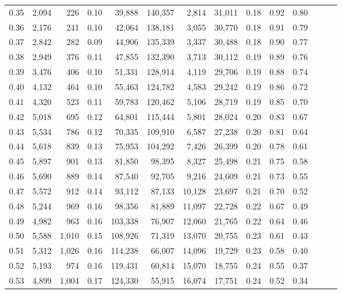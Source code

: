 \begin{tabular}{rrrrrrrrrrrrrr}
0.35 &  2,094 &    226 &  0.10 &   39,888 &  140,357 &   2,814 &  31,011 &  0.18 &  0.92 &      0.80 \\
0.36 &  2,176 &    241 &  0.10 &   42,064 &  138,181 &   3,055 &  30,770 &  0.18 &  0.91 &      0.79 \\
0.37 &  2,842 &    282 &  0.09 &   44,906 &  135,339 &   3,337 &  30,488 &  0.18 &  0.90 &      0.77 \\
0.38 &  2,949 &    376 &  0.11 &   47,855 &  132,390 &   3,713 &  30,112 &  0.19 &  0.89 &      0.76 \\
0.39 &  3,476 &    406 &  0.10 &   51,331 &  128,914 &   4,119 &  29,706 &  0.19 &  0.88 &      0.74 \\
0.40 &  4,132 &    464 &  0.10 &   55,463 &  124,782 &   4,583 &  29,242 &  0.19 &  0.86 &      0.72 \\
0.41 &  4,320 &    523 &  0.11 &   59,783 &  120,462 &   5,106 &  28,719 &  0.19 &  0.85 &      0.70 \\
0.42 &  5,018 &    695 &  0.12 &   64,801 &  115,444 &   5,801 &  28,024 &  0.20 &  0.83 &      0.67 \\
0.43 &  5,534 &    786 &  0.12 &   70,335 &  109,910 &   6,587 &  27,238 &  0.20 &  0.81 &      0.64 \\
0.44 &  5,618 &    839 &  0.13 &   75,953 &  104,292 &   7,426 &  26,399 &  0.20 &  0.78 &      0.61 \\
0.45 &  5,897 &    901 &  0.13 &   81,850 &   98,395 &   8,327 &  25,498 &  0.21 &  0.75 &      0.58 \\
0.46 &  5,690 &    889 &  0.14 &   87,540 &   92,705 &   9,216 &  24,609 &  0.21 &  0.73 &      0.55 \\
0.47 &  5,572 &    912 &  0.14 &   93,112 &   87,133 &  10,128 &  23,697 &  0.21 &  0.70 &      0.52 \\
0.48 &  5,244 &    969 &  0.16 &   98,356 &   81,889 &  11,097 &  22,728 &  0.22 &  0.67 &      0.49 \\
0.49 &  4,982 &    963 &  0.16 &  103,338 &   76,907 &  12,060 &  21,765 &  0.22 &  0.64 &      0.46 \\
0.50 &  5,588 &  1,010 &  0.15 &  108,926 &   71,319 &  13,070 &  20,755 &  0.23 &  0.61 &      0.43 \\
0.51 &  5,312 &  1,026 &  0.16 &  114,238 &   66,007 &  14,096 &  19,729 &  0.23 &  0.58 &      0.40 \\
0.52 &  5,193 &    974 &  0.16 &  119,431 &   60,814 &  15,070 &  18,755 &  0.24 &  0.55 &      0.37 \\
0.53 &  4,899 &  1,004 &  0.17 &  124,330 &   55,915 &  16,074 &  17,751 &  0.24 &  0.52 &      0.34 \\

\end{tabular}
